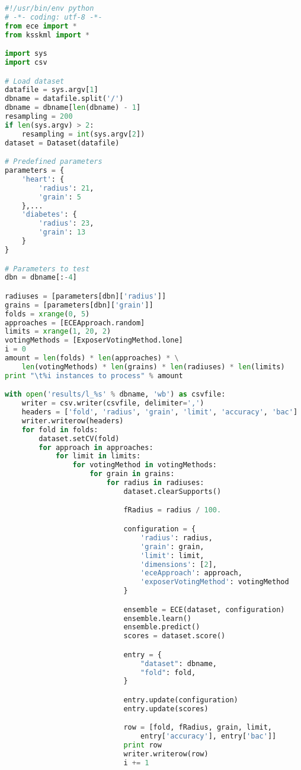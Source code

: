 \begin{lstlisting}[frame=single,language=Python,caption=Kod przykładowego eksperymentu]
#!/usr/bin/env python
# -*- coding: utf-8 -*-
from ece import *
from ksskml import *

import sys
import csv

# Load dataset
datafile = sys.argv[1]
dbname = datafile.split('/')
dbname = dbname[len(dbname) - 1]
resampling = 200
if len(sys.argv) > 2:
    resampling = int(sys.argv[2])
dataset = Dataset(datafile)

# Predefined parameters
parameters = {
    'heart': {
        'radius': 21,
        'grain': 5
    },...
    'diabetes': {
        'radius': 23,
        'grain': 13
    }
}

# Parameters to test
dbn = dbname[:-4]

radiuses = [parameters[dbn]['radius']]
grains = [parameters[dbn]['grain']]
folds = xrange(0, 5)
approaches = [ECEApproach.random]
limits = xrange(1, 20, 2)
votingMethods = [ExposerVotingMethod.lone]
i = 0
amount = len(folds) * len(approaches) * \
    len(votingMethods) * len(grains) * len(radiuses) * len(limits)
print "\t%i instances to process" % amount

with open('results/l_%s' % dbname, 'wb') as csvfile:
    writer = csv.writer(csvfile, delimiter=',')
    headers = ['fold', 'radius', 'grain', 'limit', 'accuracy', 'bac']
    writer.writerow(headers)
    for fold in folds:
        dataset.setCV(fold)
        for approach in approaches:
            for limit in limits:
                for votingMethod in votingMethods:
                    for grain in grains:
                        for radius in radiuses:
                            dataset.clearSupports()

                            fRadius = radius / 100.

                            configuration = {
                                'radius': radius,
                                'grain': grain,
                                'limit': limit,
                                'dimensions': [2],
                                'eceApproach': approach,
                                'exposerVotingMethod': votingMethod
                            }

                            ensemble = ECE(dataset, configuration)
                            ensemble.learn()
                            ensemble.predict()
                            scores = dataset.score()

                            entry = {
                                "dataset": dbname,
                                "fold": fold,
                            }

                            entry.update(configuration)
                            entry.update(scores)

                            row = [fold, fRadius, grain, limit,
                                entry['accuracy'], entry['bac']]
                            print row
                            writer.writerow(row)
                            i += 1
\end{lstlisting}